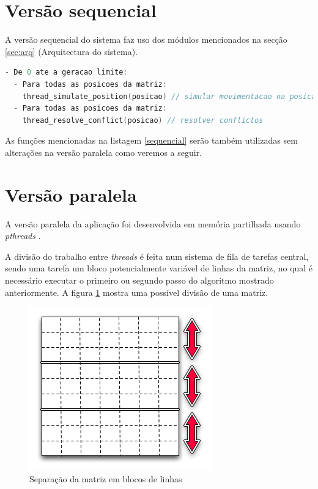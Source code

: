 \documentclass[12pt]{article}
\begin{document}
\section{Versão sequencial}

A versão sequencial do sistema faz uso dos módulos mencionados na secção \ref{sec:arq} (Arquitectura do sistema).

\begin{lstlisting}[language=c,frame=single,basicstyle=\footnotesize,caption={Algoritmo da versão sequencial.},label=sequencial]
- De 0 ate a geracao limite:
  - Para todas as posicoes da matriz:
    thread_simulate_position(posicao) // simular movimentacao na posicao
  - Para todas as posicoes da matriz:
    thread_resolve_conflict(posicao) // resolver conflictos
\end{lstlisting}

As funções mencionadas na listagem \ref{sequencial} serão também utilizadas sem alterações na versão
paralela como veremos a seguir.

\section{Versão paralela}

A versão paralela da aplicação foi desenvolvida em memória partilhada usando \textit{pthreads} \cite{pthreads}.

A divisão do trabalho entre \textit{threads} é feita num sistema de fila de tarefas central, sendo
uma tarefa um bloco potencialmente variável de linhas da matriz, no qual é necessário executar o primeiro
ou segundo passo do algoritmo mostrado anteriormente. A figura \ref{fig:tasks_matriz}
mostra uma possível divisão de uma matriz.

\begin{figure}[ht]
  \centering
    \includegraphics[scale=0.8]{diagrama_pipeline.png}
  \caption{Separação da matriz em blocos de linhas}
  \label{fig:tasks_matriz}
\end{figure}
\end{document}

